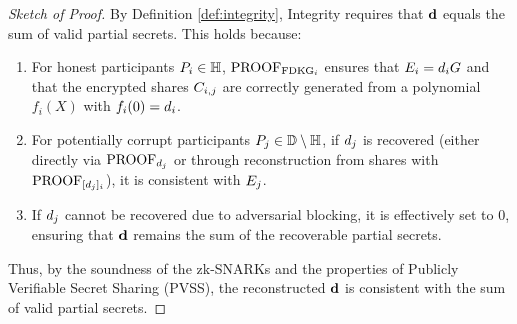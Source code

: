 \documentclass[lettersize,journal]{IEEEtran}
\theoremstyle{definition}
\begin{document}
\begin{proof}[Sketch of Proof]
By Definition \ref{def:integrity}, Integrity requires that \(\textbf{d}{}\) equals the sum of valid partial secrets. This holds because:
\begin{enumerate}
    \item For honest participants \(P_{i} \in \mathbb{H}\), \(\textrm{PROOF}_{\textrm{FDKG}_{i}}\) ensures that \(E_{i} = d_{i} G\) and that the encrypted shares \(C_{i,j}\) are correctly generated from a polynomial \(f_i(X)\) with \(f_i(0) = d_{i}\).
    \item For potentially corrupt participants \(P_{j} \in \mathbb{D} \setminus \mathbb{H}\), if \(d_{j}\) is recovered (either directly via \(\textrm{PROOF}_{d_{j}}\) or through reconstruction from shares with \(\textrm{PROOF}_{[d_{j}]_{i}}\)), it is consistent with \(E_{j}\).
    \item If \(d_{j}\) cannot be recovered due to adversarial blocking, it is effectively set to \(0\), ensuring that \(\textbf{d}{}\) remains the sum of the recoverable partial secrets.
\end{enumerate}
Thus, by the soundness of the zk-SNARKs and the properties of Publicly Verifiable Secret Sharing (PVSS), the reconstructed \(\textbf{d}{}\) is consistent with the sum of valid partial secrets.
\end{proof}


\end{document}
